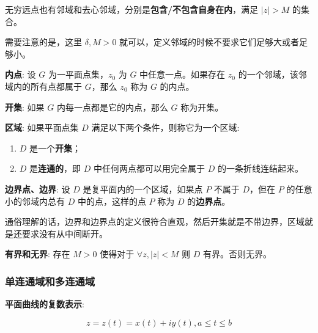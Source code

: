 \begin{tcolorbox}[title={Note},colback=red!5!white
,colframe=red!75!black
,colbacktitle=yellow!50!red
,coltitle=red!25!black, fonttitle=\bfseries,subtitle style={boxrule=0.4pt, colback=yellow!50!red!25!white}]
无穷远点也有邻域和去心邻域，分别是\textbf{包含/不包含自身在内}，满足
\(|z| > M\) 的集合。


需要注意的是，这里 \(\delta,M>0\) 就可以，定义邻域的时候不要求它们足够大或者足够小。

\end{tcolorbox}

\textbf{内点}: 设 \(G\) 为一平面点集，\(z_0\) 为 \(G\) 中任意一点。如果存在
\(z_0\) 的一个邻域，该邻域内的所有点都属于 \(G\)，那么 \(z_0\) 称为
\(G\) 的内点。

\textbf{开集}: 如果 \(G\) 内每一点都是它的内点，那么 \(G\) 称为开集。

\textbf{区域}:  如果平面点集 \(D\) 满足以下两个条件，则称它为一个区域:

\begin{enumerate}
\item \(D\) 是一个\textbf{开集}；
\item \(D\) 是\textbf{连通的}，即 \(D\) 中任何两点都可以用完全属于 \(D\)
的一条折线连结起来。
\end{enumerate}

\textbf{边界点、边界}: 设 \(D\) 是复平面内的一个区域，如果点 \(P\) 不属于
\(D\)，但在 \(P\) 的任意小的邻域内总有 \(D\) 中的点，这样的点 \(P\) 称为
\(D\) 的\textbf{边界点}。

\begin{tcolorbox}[title={Note},colback=red!5!white
,colframe=red!75!black
,colbacktitle=yellow!50!red
,coltitle=red!25!black, fonttitle=\bfseries,subtitle style={boxrule=0.4pt, colback=yellow!50!red!25!white}]
通俗理解的话，边界和边界点的定义很符合直观，然后开集就是不带边界，区域就是还要求没有从中间断开。

\end{tcolorbox}

\textbf{有界和无界}:  存在 \(M > 0\) 使得对于 \(\forall z,|z| < M\) 则 \(D\)
有界。否则无界。
\subsubsection{单连通域和多连通域}
\label{单连通域和多连通域}
\textbf{平面曲线的复数表示}:

\begin{equation*}
z=z(t)=x(t)+iy(t),a \le t \le b
\end{equation*}

